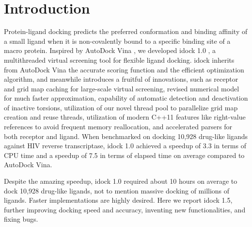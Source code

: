\documentclass{bioinfo}
\begin{document}
\section{Introduction}

Protein-ligand docking predicts the preferred conformation and binding affinity of a small ligand when it is non-covalently bound to a specific binding site of a macro protein. Inspired by AutoDock Vina \citep{595}, we developed idock 1.0 \citep{1153}, a multithreaded virtual screening tool for flexible ligand docking. idock inherits from AutoDock Vina the accurate scoring function and the efficient optimization algorithm, and meanwhile introduces a fruitful of innovations, such as receptor and grid map caching for large-scale virtual screening, revised numerical model for much faster approximation, capability of automatic detection and deactivation of inactive torsions, utilization of our novel thread pool to parallelize grid map creation and reuse threads, utilization of modern C++11 features like right-value references to avoid frequent memory reallocation, and accelerated parsers for both receptor and ligand. When benchmarked on docking 10,928 drug-like ligands against HIV reverse transcriptase, idock 1.0 achieved a speedup of 3.3 in terms of CPU time and a speedup of 7.5 in terms of elapsed time on average compared to AutoDock Vina.

Despite the amazing speedup, idock 1.0 required about 10 hours on average to dock 10,928 drug-like ligands, not to mention massive docking of millions of ligands. Faster implementations are highly desired. Here we report idock 1.5, further improving docking speed and accuracy, inventing new functionalities, and fixing bugs.
\end{document}
